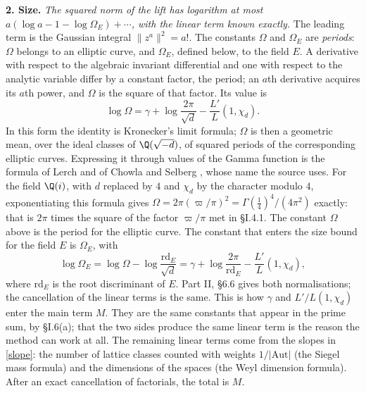 \documentclass[11pt,letterpaper]{article}
\begin{document}
\textbf{2. Size.} \emph{The squared norm of the lift has logarithm at most
$a(\log a-1-\log\Omega_E)+\cdots$, with the linear term known exactly.} The leading term is the Gaussian
integral $\|z^a\|^2=a!$. The constants $\Omega$ and $\Omega_E$ are \emph{periods}: $\Omega$ belongs to an elliptic curve, and
$\Omega_E$, defined below, to the field $E$. A derivative with respect to the algebraic invariant differential
and one with respect to the analytic variable differ by a constant factor, the period; an $a$th derivative
acquires its $a$th power, and $\Omega$ is the square of that factor. Its value is
\begin{equation}\label{D:33}
 \log\Omega=\gamma+\log\frac{2\pi}{\sqrt d}-\frac{L'}{L}(1,\chi_d).
\end{equation}
In this form the identity is Kronecker's limit formula; $\Omega$ is then a geometric mean, over the ideal
classes of $\Q(\sqrt{-d})$, of squared periods of the corresponding elliptic curves. Expressing it through
values of the Gamma function is the formula of Lerch and of Chowla and Selberg \cite{CS67}, whose name the
source uses. For the field $\Q(i)$, with $d$ replaced by $4$ and $\chi_d$ by the character modulo $4$, exponentiating this formula gives $\Omega=2\pi(\varpi/\pi)^2=\Gamma(\tfrac14)^4/(4\pi^2)$ exactly:
that is $2\pi$ times the square of the factor $\varpi/\pi$ met in \S I.4.1.
The constant $\Omega$ above is the period for the elliptic curve. The constant that enters the size bound
for the field $E$ is $\Omega_E$, with
\begin{equation}\label{D:34}
 \log\Omega_E=\log\Omega-\log\frac{\mathrm{rd}_E}{\sqrt d}
 =\gamma+\log\frac{2\pi}{\mathrm{rd}_E}-\frac{L'}{L}(1,\chi_d),
\end{equation}
where $\mathrm{rd}_E$ is the root discriminant of $E$. Part II, \S6.6 gives both normalisations; the
cancellation of the linear terms is the same.
This is how $\gamma$ and $L'/L(1,\chi_d)$ enter the main term $M$. They are the same constants that
appear in the prime sum, by \S I.6(a); that the two sides produce the same linear term is the reason
the method can work at all. The remaining linear terms come from the slopes in \eqref{slope}: the number of
lattice classes counted with weights $1/|\mathrm{Aut}|$ (the Siegel mass formula) and the dimensions of the spaces (the Weyl dimension formula).
After an exact cancellation of factorials, the total is $M$.
\end{document}
